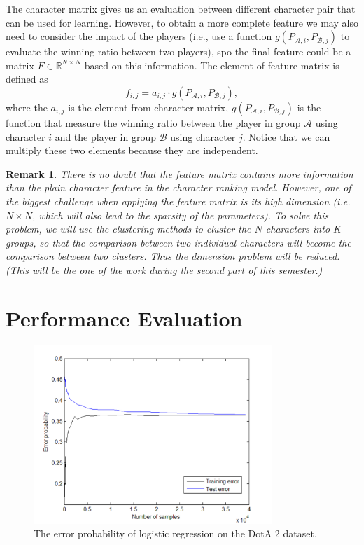 \documentclass[conference]{IEEEtran}
\newtheorem{remark}{\underline{Remark}}
\begin{document}
The character matrix gives us an evaluation between different character pair that can be used for learning. However, to obtain a more complete feature we may also need to consider the impact of the players (i.e., use a function $g(P_{\mathcal{A},i},P_{\mathcal{B},j})$ to evaluate the winning ratio between two players), spo the final feature could be a matrix $F \in \mathbb{R}^{N\times N}$ based on this information. The element of feature matrix is defined as
\begin{equation}
f_{i,j}=a_{i,j} \cdot g(P_{\mathcal{A},i},P_{\mathcal{B},j}),
\end{equation}
where the $a_{i,j}$ is the element from character matrix, $g(P_{\mathcal{A},i},P_{\mathcal{B},j})$ is the function that measure the winning ratio between the player in group $\mathcal{A}$ using character $i$ and the player in group $\mathcal{B}$ using character $j$. Notice that we can multiply these two elements because they are independent.

\begin{remark}
There is no doubt that the feature matrix contains more information than the plain character feature in the character ranking model. However, one of the biggest challenge when applying the feature matrix is its high dimension (i.e. $N\times N$, which will also lead to the sparsity of the parameters). To solve this problem, we will use the clustering methods to cluster the $N$ characters into $K$ groups, so that the comparison between two individual characters will become the comparison between two clusters. Thus the dimension problem will be reduced. (This will be the one of the work during the second part of this semester.)
\end{remark}



\section{Performance Evaluation}



\begin{figure}[t]
  \centering
    \includegraphics[width=90mm]{dota2_logreg_error.pdf}
  \caption{The error probability of logistic regression on the DotA 2 dataset.}
  \label{fig:dota2_log}
\end{figure}
\end{document}
